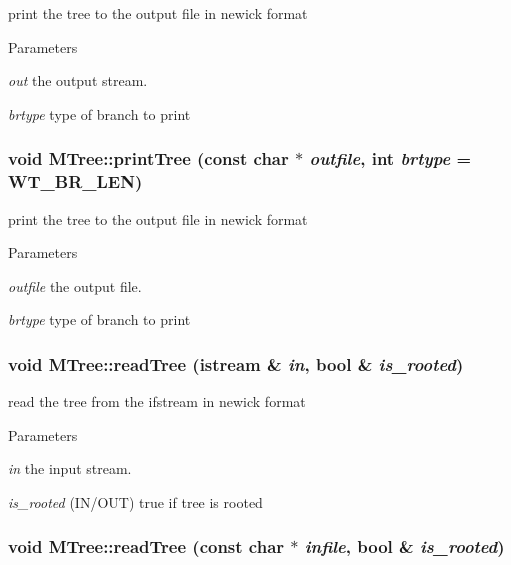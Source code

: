 \label{classMTree_a55093d54d06d5e8841799a9bf7a0ce87}
print the tree to the output file in newick format 
\begin{DoxyParams}{Parameters}
\item[{\em out}]the output stream. \item[{\em brtype}]type of branch to print \end{DoxyParams}
\hypertarget{classMTree_a96831ce48d235543e2c5ecb5fed65f75}{
\subsubsection[{printTree}]{\setlength{\rightskip}{0pt plus 5cm}void MTree::printTree (const char $\ast$ {\em outfile}, \/  int {\em brtype} = {\ttfamily WT\_\-BR\_\-LEN})}}
\label{classMTree_a96831ce48d235543e2c5ecb5fed65f75}
print the tree to the output file in newick format 
\begin{DoxyParams}{Parameters}
\item[{\em outfile}]the output file. \item[{\em brtype}]type of branch to print \end{DoxyParams}
\hypertarget{classMTree_a7ca6e031f4df4f38bad9f45a5d4891fb}{
\subsubsection[{readTree}]{\setlength{\rightskip}{0pt plus 5cm}void MTree::readTree (istream \& {\em in}, \/  bool \& {\em is\_\-rooted})}}
\label{classMTree_a7ca6e031f4df4f38bad9f45a5d4891fb}
read the tree from the ifstream in newick format 
\begin{DoxyParams}{Parameters}
\item[{\em in}]the input stream. \item[{\em is\_\-rooted}](IN/OUT) true if tree is rooted \end{DoxyParams}
\hypertarget{classMTree_abc9c58ea59b80013b0581fe3644c9149}{
\subsubsection[{readTree}]{\setlength{\rightskip}{0pt plus 5cm}void MTree::readTree (const char $\ast$ {\em infile}, \/  bool \& {\em is\_\-rooted})}}
\label{classMTree_abc9c58ea59b80013b0581fe3644c9149}
